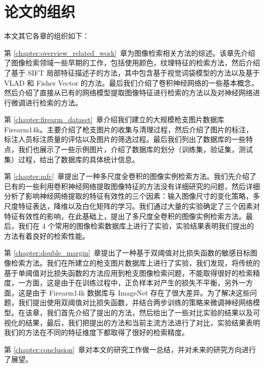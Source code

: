 \section{论文的组织}
本文其它各章的组织如下：

第 \ref{chapter:overview_related_work}~章为图像检索相关方法的综述。该章先介绍了图像检索领域一些早期的工作，包括使用颜色，纹理特征的检索方法，然后介绍了基于 SIFT 局部特征描述子的方法，其中包含基于视觉词袋模型的方法以及基于 VLAD 和 Fisher Vector 的方法。最后我们介绍了卷积神经网络的一些基本概念，然后介绍了直接从已有的网络模型提取图像特征进行检索的方法以及对神经网络进行微调进行检索的方法。

第 \ref{chapter:firearm_dataset}~章介绍我们建立的大规模枪支图片数据库 Firearm14k。主要介绍了枪支图片的收集与清理过程，然后介绍了图片的标注，标注人员标注质量的评估以及图片的筛选过程。最后我们列出了数据库的一些特点，我们也展示了一些示例图片，介绍了数据库的划分（训练集，验证集，测试集）过程，给出了数据库的具体统计信息。

第 \ref{chapter:mfc}~章提出了一种多尺度全卷积的图像实例检索方法。我们先介绍了已有的一些利用卷积神经网络提取图像特征的方法没有详细研究的问题，然后详细分析了影响神经网络提取的特征有效性的三个因素：输入图像尺寸的变化策略，多尺度特征表达，降维以及白化矩阵的学习。我们通过大量的实验确定了三个因素对特征有效性的影响，在此基础上，提出了多尺度全卷积的图像实例检索方法。最后，我们在 4 个常用的图像检索数据库上进行了实验，实验结果表明我们提出的方法有着良好的检索性能。

第 \ref{chapter:double_margin}~章提出了一种基于双阈值对比损失函数的敏感目标图像检索方法。我们在所建立的枪支图片数据库上进行了实验，我们发现，将传统的基于单阈值对比损失函数的方法应用到枪支图像检索问题，不能取得很好的检索精度，一方面，这是由于在训练过程中，正负样本对产生的损失不平衡，另外一方面，这是由于 Firearm14k 数据库与 ImageNet 存在了很大差异。为了解决这些问题，我们提出使用双阈值对比损失函数，并结合两步训练的策略来微调神经网络模型。在该章，我们首先介绍了提出的方法，然后给出了一些对比实验的结果以及可视化的结果，最后，我们把提出的方法和当前主流方法进行了对比，实验结果表明我们的方法在不同的特征维度下都取得了很好的检索精度。

第 \ref{chapter:conclusion}~章对本文的研究工作做一总结，并对未来的研究方向进行了展望。
